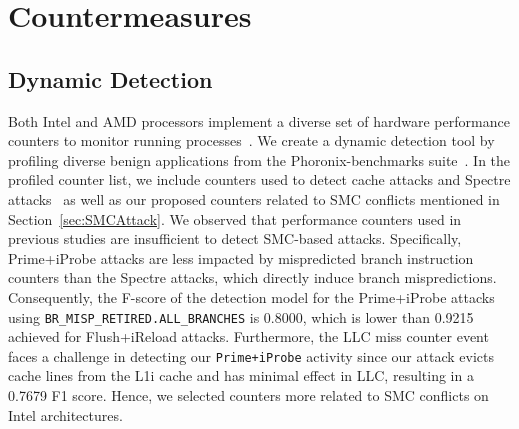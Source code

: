 \section{Countermeasures}\label{sec:countermeasures}

\subsection{Dynamic Detection}\label{sec:dynamic_detection}

Both Intel and AMD processors implement a diverse set of hardware performance counters to monitor running processes~\cite{zhang2016cloudradar,briongos2018cacheshield,gulmezoglu2019fortuneteller}. We create a dynamic detection tool by profiling diverse benign applications from the Phoronix-benchmarks suite~\cite{OpenBenchmarkingTests}. %
In the profiled counter list, we include counters used to detect cache attacks and Spectre attacks~\cite{zhang2016cloudradar,briongos2018cacheshield,gulmezoglu2019fortuneteller} as well as our proposed counters related to SMC conflicts mentioned in Section~\ref{sec:SMCAttack}. 
We observed that performance counters used in previous studies are insufficient to detect SMC-based attacks. Specifically, Prime+iProbe attacks are less impacted by mispredicted branch instruction counters than the Spectre attacks, which directly induce branch mispredictions. Consequently, the F-score of the detection model for the Prime+iProbe attacks using \texttt{BR\_\allowbreak MISP\_\allowbreak RETIRED.ALL\_\allowbreak BRANCHES} is 0.8000, which is lower than 0.9215 achieved for Flush+iReload attacks. Furthermore, the LLC miss counter event~\cite{gulmezoglu2019fortuneteller} faces a challenge in detecting our \texttt{Prime+iProbe} activity since our attack evicts cache lines from the L1i cache and has minimal effect in LLC, resulting in a 0.7679 F1 score. Hence, we selected counters more related to SMC conflicts on Intel architectures.

